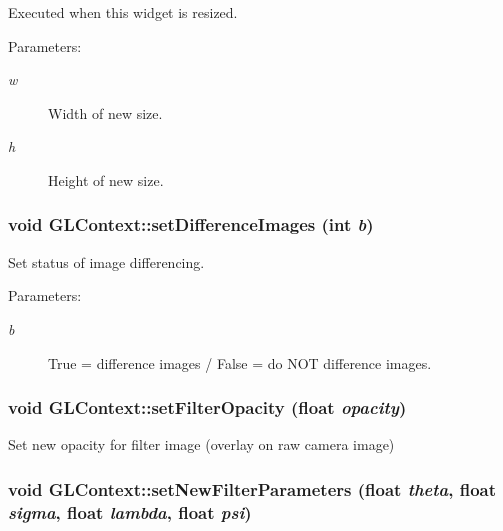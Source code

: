 Executed when this widget is resized. \begin{Desc}
\item[Parameters:]
\begin{description}
\item[{\em w}]Width of new size. \item[{\em h}]Height of new size. \end{description}
\end{Desc}
\hypertarget{classGLContext_f3f800a58fc12d95d4604de755c7fa57}{
\subsubsection[{setDifferenceImages}]{\setlength{\rightskip}{0pt plus 5cm}void GLContext::setDifferenceImages (int {\em b})}}
\label{classGLContext_f3f800a58fc12d95d4604de755c7fa57}


Set status of image differencing. \begin{Desc}
\item[Parameters:]
\begin{description}
\item[{\em b}]True = difference images / False = do NOT difference images. \end{description}
\end{Desc}
\hypertarget{classGLContext_a70a83ef6631a6348b030302d59c81a1}{
\subsubsection[{setFilterOpacity}]{\setlength{\rightskip}{0pt plus 5cm}void GLContext::setFilterOpacity (float {\em opacity})}}
\label{classGLContext_a70a83ef6631a6348b030302d59c81a1}


Set new opacity for filter image (overlay on raw camera image) \hypertarget{classGLContext_dcb0d67f5abe53af20878c897fa645ec}{
\subsubsection[{setNewFilterParameters}]{\setlength{\rightskip}{0pt plus 5cm}void GLContext::setNewFilterParameters (float {\em theta}, \/  float {\em sigma}, \/  float {\em lambda}, \/  float {\em psi})}}
\label{classGLContext_dcb0d67f5abe53af20878c897fa645ec}


